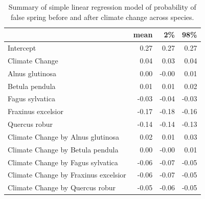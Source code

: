 \documentclass{article}\usepackage[]{graphicx}\usepackage[]{color}
\begin{document}
\begin{table}[H]
\centering
\caption{Summary of simple linear regression model of probability of false spring before and after climate change across species.} 
\begin{tabular}{lrrr}
  \hline
 & mean & 2\% & 98\% \\ 
  \hline
Intercept & 0.27 & 0.27 & 0.27 \\ 
  Climate Change & 0.04 & 0.03 & 0.04 \\ 
  Alnus glutinosa & 0.00 & -0.00 & 0.01 \\ 
  Betula pendula & 0.01 & 0.01 & 0.02 \\ 
  Fagus sylvatica & -0.03 & -0.04 & -0.03 \\ 
  Fraxinus excelsior & -0.17 & -0.18 & -0.16 \\ 
  Quercus robur & -0.14 & -0.14 & -0.13 \\ 
  Climate Change by Alnus glutinosa & 0.02 & 0.01 & 0.03 \\ 
  Climate Change by Betula pendula & 0.00 & -0.00 & 0.01 \\ 
  Climate Change by Fagus sylvatica & -0.06 & -0.07 & -0.05 \\ 
  Climate Change by Fraxinus excelsior & -0.06 & -0.07 & -0.05 \\ 
  Climate Change by Quercus robur & -0.05 & -0.06 & -0.05 \\ 
   \hline
\end{tabular}
\end{table}
\end{document}
